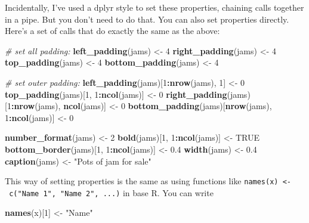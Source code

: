 \documentclass[]{article}
\newenvironment{Shaded}{\begin{snugshade}}{\end{snugshade}}
\newcommand{\CommentTok}[1]{\textcolor[rgb]{0.56,0.35,0.01}{\textit{#1}}}
\newcommand{\DecValTok}[1]{\textcolor[rgb]{0.00,0.00,0.81}{#1}}
\newcommand{\FloatTok}[1]{\textcolor[rgb]{0.00,0.00,0.81}{#1}}
\newcommand{\KeywordTok}[1]{\textcolor[rgb]{0.13,0.29,0.53}{\textbf{#1}}}
\newcommand{\NormalTok}[1]{#1}
\newcommand{\OperatorTok}[1]{\textcolor[rgb]{0.81,0.36,0.00}{\textbf{#1}}}
\newcommand{\OtherTok}[1]{\textcolor[rgb]{0.56,0.35,0.01}{#1}}
\newcommand{\StringTok}[1]{\textcolor[rgb]{0.31,0.60,0.02}{#1}}
\begin{document}
Incidentally, I've used a dplyr style to set these properties, chaining
calls together in a pipe. But you don't need to do that. You can also
set properties directly. Here's a set of calls that do exactly the same
as the above:

\begin{Shaded}
\begin{Highlighting}[]
\CommentTok{# set all padding:}
\KeywordTok{left_padding}\NormalTok{(jams) <-}\StringTok{ }\DecValTok{4}
\KeywordTok{right_padding}\NormalTok{(jams) <-}\StringTok{ }\DecValTok{4}
\KeywordTok{top_padding}\NormalTok{(jams) <-}\StringTok{ }\DecValTok{4}
\KeywordTok{bottom_padding}\NormalTok{(jams) <-}\StringTok{ }\DecValTok{4}

\CommentTok{# set outer padding:}
\KeywordTok{left_padding}\NormalTok{(jams)[}\DecValTok{1}\OperatorTok{:}\KeywordTok{nrow}\NormalTok{(jams), }\DecValTok{1}\NormalTok{] <-}\StringTok{ }\DecValTok{0}
\KeywordTok{top_padding}\NormalTok{(jams)[}\DecValTok{1}\NormalTok{, }\DecValTok{1}\OperatorTok{:}\KeywordTok{ncol}\NormalTok{(jams)] <-}\StringTok{ }\DecValTok{0}
\KeywordTok{right_padding}\NormalTok{(jams)[}\DecValTok{1}\OperatorTok{:}\KeywordTok{nrow}\NormalTok{(jams), }\KeywordTok{ncol}\NormalTok{(jams)] <-}\StringTok{ }\DecValTok{0}
\KeywordTok{bottom_padding}\NormalTok{(jams)[}\KeywordTok{nrow}\NormalTok{(jams), }\DecValTok{1}\OperatorTok{:}\KeywordTok{ncol}\NormalTok{(jams)] <-}\StringTok{ }\DecValTok{0}

\KeywordTok{number_format}\NormalTok{(jams) <-}\StringTok{ }\DecValTok{2}
\KeywordTok{bold}\NormalTok{(jams)[}\DecValTok{1}\NormalTok{, }\DecValTok{1}\OperatorTok{:}\KeywordTok{ncol}\NormalTok{(jams)] <-}\StringTok{ }\OtherTok{TRUE}
\KeywordTok{bottom_border}\NormalTok{(jams)[}\DecValTok{1}\NormalTok{, }\DecValTok{1}\OperatorTok{:}\KeywordTok{ncol}\NormalTok{(jams)] <-}\StringTok{ }\FloatTok{0.4}
\KeywordTok{width}\NormalTok{(jams) <-}\StringTok{ }\FloatTok{0.4}
\KeywordTok{caption}\NormalTok{(jams) <-}\StringTok{ "Pots of jam for sale"}
\end{Highlighting}
\end{Shaded}

\FloatBarrier

This way of setting properties is the same as using functions like
\texttt{names(x)\ \textless{}-\ c("Name\ 1",\ "Name\ 2",\ ...)} in base
R. You can write

\begin{Shaded}
\begin{Highlighting}[]
\KeywordTok{names}\NormalTok{(x)[}\DecValTok{1}\NormalTok{] <-}\StringTok{ "Name"}
\end{Highlighting}
\end{Shaded}
\end{document}
